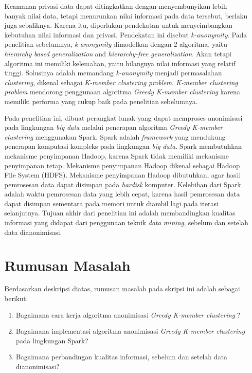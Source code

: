 \documentclass[a4paper,twoside]{article}
\begin{document}
Keamanan privasi data dapat ditingkatkan dengan menyembunyikan lebih banyak nilai data, tetapi menurunkan nilai informasi pada data tersebut, berlaku juga sebaliknya. Karena itu, diperlukan pendekatan untuk menyeimbangkan kebutuhan nilai informasi dan privasi. Pendekatan ini disebut {\it k-anonymity}. Pada penelitian sebelumnya, {\it k-anonymity} dimodelkan dengan 2 algoritma, yaitu {\it hierarchy based generalization} and {\it hierarchy-free generalization}. Akan tetapi algoritma ini memiliki kelemahan, yaitu hilangnya nilai informasi yang relatif tinggi. Solusinya adalah memandang {\it k-anonymity} menjadi permasalahan {\it clustering}, dikenal sebagai {\it K-member clustering problem}. {\it K-member clustering problem} mendorong penggunaan algoritma {\it Greedy K-member clustering } karena memiliki performa yang cukup baik pada penelitian sebelumnya.

Pada penelitian ini, dibuat perangkat lunak yang dapat memproses anonimisasi pada lingkungan {\it big data} melalui penerapan algoritma {\it Greedy K-member clustering } menggunakan Spark. Spark adalah {\it framework} yang mendukung penerapan komputasi kompleks pada lingkungan {\it big data}. Spark membutuhkan mekanisme penyimpanan Hadoop, karena Spark tidak memiliki mekanisme penyimpanan tetap. Mekanisme penyimpanan Hadoop dikenal sebagai Hadoop File System (HDFS). Mekanisme penyimpanan Hadoop dibutuhkan, agar hasil pemrosesan data dapat disimpan pada {\it hardisk} komputer. Kelebihan dari Spark adalah waktu pemrosesan data yang lebih cepat, karena hasil pemrosesan data dapat disimpan sementara pada memori untuk diambil lagi pada iterasi selanjutnya. Tujuan akhir dari penelitian ini adalah membandingkan kualitas informasi yang didapat dari penggunaan teknik {\it data mining}, sebelum dan setelah data dianonimisasi.




\section{Rumusan Masalah}
Berdasarkan deskripsi diatas, rumusan masalah pada skripsi ini adalah sebagai berikut:
\begin{enumerate}
	\item Bagaimana cara kerja algoritma anonimisasi {\it Greedy K-member clustering} ?
	\item Bagaimana implementasi algoritma anonimisasi {\it Greedy K-member clustering } pada lingkungan Spark?
	\item Bagaimana perbandingan kualitas informasi, sebelum dan setelah data dianonimisasi?
\end{enumerate}
\end{document}
